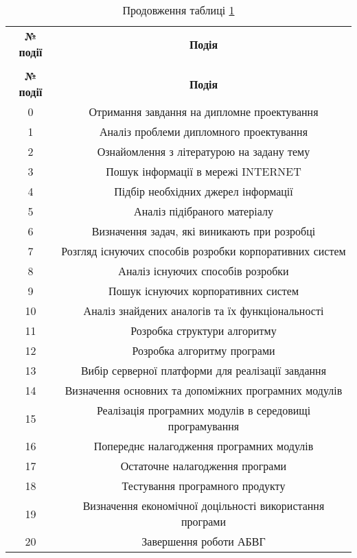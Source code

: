 {\footnotesize
\begin{longtable}{|c|c|}

\captionsetup{justification=centering}
\caption{Події мережевого графа}\label{t:eco_1}\\
\hline
\multicolumn{1}{|c|}{\textbf{№ події}}&
\multicolumn{1}{c|}{\textbf{Подія}}\\\hline

\endfirsthead
\caption*{\hfill Продовження таблиці \ref{t:eco_1}}\\\hline

\multicolumn{1}{|c|}{\textbf{№ події}}&
\multicolumn{1}{c|}{\textbf{Подія}}\\\hline
\endhead

0 & Отримання завдання на дипломне проектування\\ \hline
1 & Аналіз проблеми дипломного проектування \\ \hline
2 & Ознайомлення з літературою на задану тему \\ \hline
3 & Пошук інформації в мережі INTERNET \\ \hline
4 & Підбір необхідних джерел інформації  \\ \hline
5 & Аналіз підібраного матеріалу  \\ \hline
6 & Визначення задач, які виникають при розробці  \\ \hline
7 & Розгляд існуючих способів розробки корпоративних систем \\ \hline
8 & Аналіз існуючих способів розробки  \\ \hline
9 & Пошук існуючих корпоративних систем \\ \hline
10 & Аналіз знайдених аналогів та їх функціональності \\ \hline
11 & Розробка структури алгоритму  \\ \hline
12 & Розробка алгоритму програми  \\ \hline
13 & Вибір серверної  платформи для реалізації завдання  \\ \hline
14 & Визначення основних та допоміжних програмних модулів  \\ \hline
15 & Реалізація програмних модулів в середовищі програмування  \\ \hline
16 & Попереднє налагодження програмних модулів \\ \hline
17 & Остаточне налагодження програми \\ \hline
18 & Тестування програмного продукту \\ \hline
19 & Визначення економічної доцільності використання програми \\ \hline
20 & Завершення роботи АБВГ\\ \hline

\end{longtable}
}


